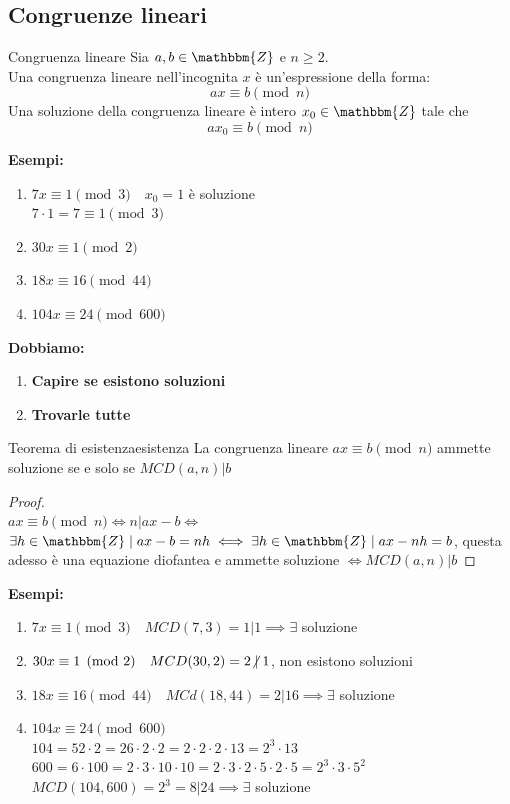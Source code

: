 \documentclass[12pt, letterpaper]{report}
\newcounter{theorem}
\newcounter{definition}
\newcommand{\nmu}{}
\begin{document}
		\subsection{Congruenze lineari}
		\begin{definition}{\nmu Congruenza lineare}
			Sia $a, b \in \mathbbm{Z}$ e $n \geq 2$. \\
			Una congruenza lineare nell'incognita $x$ è un'espressione della forma:
			\[
			ax \equiv b \pmod{n}
			\]
			Una soluzione della congruenza lineare è intero $x_0 \in \mathbbm{Z}$ tale che \[ax_0 \equiv b \pmod{n}\]
		\end{definition}
		\textbf{Esempi:}
		\begin{enumerate}
			\item $7x \equiv 1 \pmod{3} \quad x_0 = 1$ è soluzione \\
			$7\cdot 1 = 7 \equiv 1 \pmod{3}$
			\item $30x \equiv 1 \pmod{2}$
			\item $18x \equiv 16 \pmod{44}$
			\item $104x \equiv 24 \pmod{600}$
		\end{enumerate}
		\textbf{Dobbiamo:}
		\begin{enumerate}
			\item \textbf{Capire se esistono soluzioni}
			\item \textbf{Trovarle tutte}
		\end{enumerate}
		\begin{theorem}{\nmu Teorema di esistenza}{esistenza}
			La congruenza lineare $ax \equiv b \pmod{n}$ ammette soluzione se e solo se $MCD(a,n) | b$
			\begin{proof}\quad \\
				$ax \equiv b \pmod{n} \iff n | ax - b \iff$
				$\exists h \in \mathbbm{Z} \mid ax - b = nh \iff \exists h \in \mathbbm{Z} \mid ax - nh = b$, questa adesso è una equazione diofantea e ammette soluzione $\iff MCD(a,n) | b$
			\end{proof}
		\end{theorem}
		\textbf{Esempi:}
		\begin{enumerate}
			\item $7x \equiv 1 \pmod{3} \quad MCD(7,3) = 1 | 1 \implies \exists$ soluzione
			\item $30x \equiv 1 \pmod{2} \quad MCD(30, 2) = 2 \centernot{|} 1$, non esistono soluzioni
			\item $18x \equiv 16 \pmod{44} \quad MCd(18, 44) = 2 | 16 \implies \exists$ soluzione
			\item $104x \equiv 24 \pmod{600}$ \\
			$104 = 52 \cdot 2 = 26 \cdot 2 \cdot 2 = 2 \cdot 2 \cdot 2 \cdot 13 = 2^3 \cdot 13$ \\
			$600 = 6 \cdot 100 = 2 \cdot 3 \cdot 10 \cdot 10 = 2 \cdot 3 \cdot 2 \cdot 5 \cdot 2 \cdot 5 = 2^3 \cdot 3 \cdot 5^2$ \\
			$MCD(104, 600) = 2^3 = 8 | 24 \implies \exists$ soluzione
		\end{enumerate}
\end{document}
